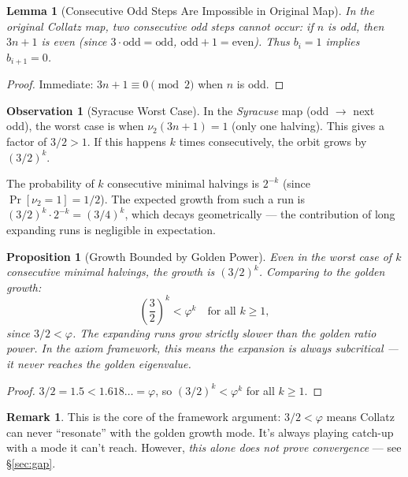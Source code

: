 \documentclass[11pt,a4paper]{article}
\newtheorem{lemma}[theorem]{Lemma}
\newtheorem{proposition}[theorem]{Proposition}
\theoremstyle{definition}
\newtheorem{remark}[theorem]{Remark}
\newtheorem{observation}[theorem]{Observation}
\begin{document}
\begin{lemma}[Consecutive Odd Steps Are Impossible in Original Map]\label{lem:no-consec}
In the original Collatz map, two consecutive odd steps cannot occur: if $n$ is
odd, then $3n + 1$ is even (since $3 \cdot\text{odd} = \text{odd}$,
$\text{odd} + 1 = \text{even}$). Thus $b_i = 1$ implies $b_{i+1} = 0$.
\end{lemma}

\begin{proof}
Immediate: $3n + 1 \equiv 0 \pmod{2}$ when $n$ is odd.
\end{proof}

\begin{observation}[Syracuse Worst Case]
In the \emph{Syracuse} map (odd $\to$ next odd), the worst case is when
$\nu_2(3n+1) = 1$ (only one halving). This gives a factor of $3/2 > 1$.
If this happens $k$ times consecutively, the orbit grows by $(3/2)^k$.

The probability of $k$ consecutive minimal halvings is $2^{-k}$ (since
$\Pr[\nu_2 = 1] = 1/2$). The expected growth from such a run is
$(3/2)^k \cdot 2^{-k} = (3/4)^k$, which decays geometrically --- the
contribution of long expanding runs is negligible in expectation.
\end{observation}

\begin{proposition}[Growth Bounded by Golden Power]\label{prop:golden-bound}
Even in the worst case of $k$ consecutive minimal halvings, the growth is
$(3/2)^k$. Comparing to the golden growth:
\[
  \left(\frac{3}{2}\right)^k < \varphi^k \quad \text{for all } k \geq 1,
\]
since $3/2 < \varphi$. The expanding runs grow strictly slower than the golden
ratio power. In the axiom framework, this means the expansion is always
subcritical --- it never reaches the golden eigenvalue.
\end{proposition}

\begin{proof}
$3/2 = 1.5 < 1.618\ldots = \varphi$, so $(3/2)^k < \varphi^k$ for all
$k \geq 1$.
\end{proof}

\begin{remark}
This is the core of the framework argument: $3/2 < \varphi$ means Collatz can
never ``resonate'' with the golden growth mode. It's always playing catch-up
with a mode it can't reach. However, \emph{this alone does not prove
convergence} --- see \S\ref{sec:gap}.
\end{remark}
\end{document}
